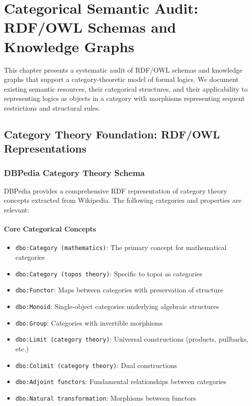 
\chapter*{Categorical Semantic Audit: RDF/OWL Schemas and Knowledge Graphs}

This chapter presents a systematic audit of RDF/OWL schemas and knowledge graphs that support a category-theoretic model of formal logics. We document existing semantic resources, their categorical structures, and their applicability to representing logics as objects in a category with morphisms representing sequent restrictions and structural rules.

\section{Category Theory Foundation: RDF/OWL Representations}

\subsection{DBPedia Category Theory Schema}

DBPedia provides a comprehensive RDF representation of category theory concepts extracted from Wikipedia. The following categories and properties are relevant:

\subsubsection{Core Categorical Concepts}

\begin{itemize}
  \item \texttt{dbo:Category (mathematics)}: The primary concept for mathematical categories
  \item \texttt{dbo:Category (topos theory)}: Specific to topoi as categories
  \item \texttt{dbo:Functor}: Maps between categories with preservation of structure
  \item \texttt{dbo:Monoid}: Single-object categories underlying algebraic structures
  \item \texttt{dbo:Group}: Categories with invertible morphisms
  \item \texttt{dbo:Limit (category theory)}: Universal constructions (products, pullbacks, etc.)
  \item \texttt{dbo:Colimit (category theory)}: Dual constructions
  \item \texttt{dbo:Adjoint functors}: Fundamental relationships between categories
  \item \texttt{dbo:Natural transformation}: Morphisms between functors
\end{itemize}

